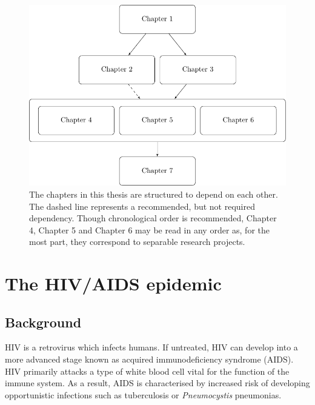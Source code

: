 \documentclass[a4paper, nobind]{templates/ociamthesis}
\begin{document}
\begin{figure}

{\centering \includegraphics[width=0.95\linewidth]{figures/introduction/chapter-flowchart} 

}

\caption{The chapters in this thesis are structured to depend on each other. The dashed line represents a recommended, but not required dependency. Though chronological order is recommended, Chapter 4, Chapter 5 and Chapter 6 may be read in any order as, for the most part, they correspond to separable research projects.}\label{fig:chapter-flowchart}
\end{figure}

\hypertarget{hiv-aids}{%
\chapter{The HIV/AIDS epidemic}\label{hiv-aids}}

\adjustmtc
{}

\hypertarget{background}{%
\section{Background}\label{background}}

HIV is a retrovirus which infects humans.
If untreated, HIV can develop into a more advanced stage known as acquired immunodeficiency syndrome (AIDS).
HIV primarily attacks a type of white blood cell vital for the function of the immune system.
As a result, AIDS is characterised by increased risk of developing opportunistic infections such as tuberculosis or \emph{Pneumocystis} pneumonias.
\end{document}
